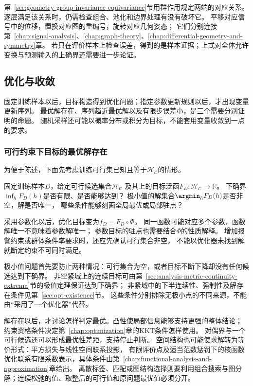 第~\ref{sec:geometry-group-invariance-equivariance}节用群作用规定两端的对应关系。
逐层满足该关系时，仍需检查组合、池化和边界处理有没有破坏它。
平移对应信号中的位移，置换对应图的重编号，旋转对应几何姿态；
它们分别连接第~\ref{chap:signal-analysis}、\ref{chap:graph-theory}、\ref{chap:differential-geometry-and-symmetry}章。
若只在评价样本上检查误差，得到的是样本证据；上式对全体允许变换与预测输入的上确界还需要进一步论证。

\subsection{优化与收敛}
\label{sec:future-objective-object-map}
\label{sec:future-iteration-object-map}

固定训练样本以后，目标构造得到优化问题；指定参数更新规则以后，才出现变量更新序列。
最优解存在、序列趋近最优解以及有限步误差小，是三个需要分别证明的命题。
随机采样还可能以概率分布或积分为目标，不能套用变量收敛到一点的要求。

\subsubsection{可行约束下目标的最优解存在}
\label{sec:future-analysis-minimizer}

为便于陈述，下面先考虑训练可行集已知且等于$\mathcal H_{\mathcal C}$的情形。

\begin{mathproblem}[目标泛函的极小值与解]
  \label{question:future-minimizer}
  固定训练样本$D$，给定可行候选集合$\mathcal H_{\mathcal C}$
  及其上的目标泛函$F_D:\mathcal H_{\mathcal C}\to\mathbb R$。
  下确界$\inf_hF_D(h)$是否有限、是否能够达到？
  极小值的解集合$\argmin_hF_D(h)$是否非空，解是否唯一，
  哪些条件能够刻画全局最优或局部驻点？
\end{mathproblem}

采用参数化以后，优化目标变为$f_D=F_D\circ\Phi$。
同一函数可能对应多个参数，函数解唯一不意味着参数解唯一；
参数目标的驻点也需要结合$\Phi$的性质解释。
增加报警约束或群体条件率要求时，还应先确认可行集合非空，
不能以优化器未找到解就断定约束不可同时满足。

极小值问题首先要防止两种情况：可行集合为空，或者目标不断下降却没有任何候选达到下确界。
非空紧域上的连续目标可由第~\ref{sec:analysis-metric-continuity-extrema}节的极值定理保证达到下确界；
非紧域中的下半连续性、强制性及解存在条件见第~\ref{sec:opt-existence}节。
这些条件分别排除无极小点的不同来源，不能由“采用了一个优化器”代替。

解存在以后，才讨论怎样判定最优。凸性使局部信息能够支持更强的整体结论；
约束资格条件决定第~\ref{chap:optimization}章的KKT条件怎样使用。
对偶界与一个可行候选还可以形成最优性差距，支持停止判断。
空间结构也可能使求解转为等价形式：平方损失与线性空间联系投影，
有限评价点及适当范数惩罚下的核函数优化联系有限系数表示，具体条件由第~\ref{chap:functional-analysis-and-approximation}章给出。
离散标签、匹配或图结构选择则要利用组合搜索与图分解；连续松弛的值、取整后的可行值和原问题最优值必须分开。

